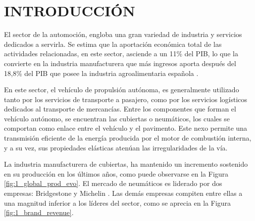 
\section{INTRODUCCIÓN}\label{sec:intro}

El sector de la automoción,
engloba una gran variedad de industria y servicios dedicados a servirla.
Se estima que la aportación económica total de las actividades relacionadas,
en este sector, asciende a un 11\% del PIB,
lo que la convierte en la industria manufacturera que más ingresos aporta
después  del 18,8\% del PIB que posee la industria agroalimentaria española
\citep{caixabank2021analisis}.

En este sector, el vehículo de propulsión autónoma,
es generalmente utilizado tanto por los servicios de transporte a pasajero,
como por los servicios logísticos dedicados al transporte de mercancías.
Entre los componentes que forman el vehículo autónomo,
se encuentran las cubiertas o neumáticos,
los cuales se comportan como enlace entre el vehículo y el pavimento.
Este nexo permite una transmisión eficiente
de la energía producida por el motor de combustión interna,
y a su vez, sus propiedades elásticas atenúan las irregularidades de la vía.

La industria manufacturera de cubiertas,
ha mantenido un incremento sostenido en su producción en los últimos años,
como puede observarse en la Figura \ref{fig:1_global_prod_evo}.
El mercado de neumáticos es liderado por dos empresas: Bridgestone y Michelin
\citep{rodgers2020tire}.
Las demás empresas compiten entre ellas
a una magnitud inferior a los líderes del sector,
como se aprecia en la Figura \ref{fig:1_brand_revenue}.

